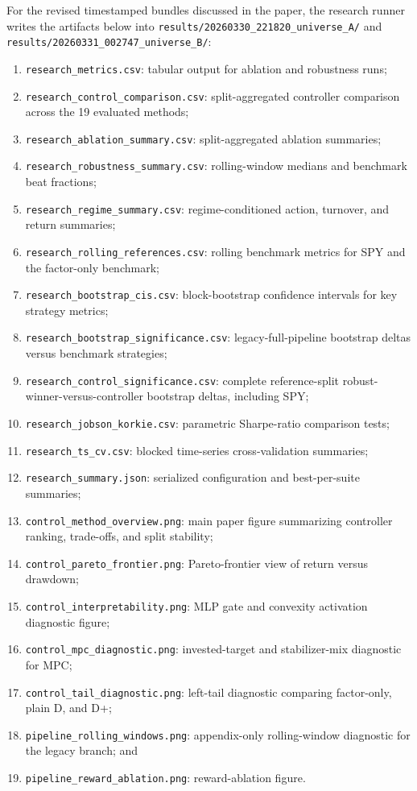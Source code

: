 \documentclass[10pt,twocolumn]{article}
\begin{document}
For the revised timestamped bundles discussed in the paper, the research runner
writes the artifacts below into
\texttt{results/20260330\_221820\_universe\_A/} and
\texttt{results/20260331\_002747\_universe\_B/}:
\begin{enumerate}[leftmargin=1.5em, itemsep=2pt, topsep=4pt]
\item \texttt{research\_metrics.csv}: tabular output for ablation and robustness runs;
\item \texttt{research\_control\_comparison.csv}: split-aggregated controller comparison across the 19 evaluated methods;
\item \texttt{research\_ablation\_summary.csv}: split-aggregated ablation summaries;
\item \texttt{research\_robustness\_summary.csv}: rolling-window medians and benchmark beat fractions;
\item \texttt{research\_regime\_summary.csv}: regime-conditioned action, turnover, and return summaries;
\item \texttt{research\_rolling\_references.csv}: rolling benchmark metrics for SPY and the factor-only benchmark;
\item \texttt{research\_bootstrap\_cis.csv}: block-bootstrap confidence intervals for key strategy metrics;
\item \texttt{research\_bootstrap\_significance.csv}: legacy-full-pipeline bootstrap deltas versus benchmark strategies;
\item \texttt{research\_control\_significance.csv}: complete reference-split robust-winner-versus-controller bootstrap deltas, including SPY;
\item \texttt{research\_jobson\_korkie.csv}: parametric Sharpe-ratio comparison tests;
\item \texttt{research\_ts\_cv.csv}: blocked time-series cross-validation summaries;
\item \texttt{research\_summary.json}: serialized configuration and best-per-suite summaries;
\item \texttt{control\_method\_overview.png}: main paper figure summarizing controller ranking, trade-offs, and split stability;
\item \texttt{control\_pareto\_frontier.png}: Pareto-frontier view of return versus drawdown;
\item \texttt{control\_interpretability.png}: MLP gate and convexity activation diagnostic figure;
\item \texttt{control\_mpc\_diagnostic.png}: invested-target and stabilizer-mix diagnostic for MPC;
\item \texttt{control\_tail\_diagnostic.png}: left-tail diagnostic comparing factor-only, plain D, and D+;
\item \texttt{pipeline\_rolling\_windows.png}: appendix-only rolling-window diagnostic for the legacy branch; and
\item \texttt{pipeline\_reward\_ablation.png}: reward-ablation figure.
\end{enumerate}
\end{document}
